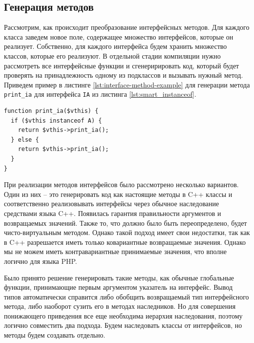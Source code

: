 \subsection{Генерация методов}
Рассмотрим, как происходит преобразование интерфейсных методов.
Для каждого класса заведем новое поле, содержащее множество интерфейсов, которые он реализует.
Собственно, для каждого интерфейса будем хранить множество классов, которые его реализуют.
В отдельной стадии компиляции нужно рассмотреть все интерфейсные функции и сгенеририровать код, который будет проверять на принадлежность одному из подклассов и вызывать нужный метод.
Приведем пример в листинге \ref{lst:interface-method-example} для генерации метода \verb|print_ia| для интерфейса \verb|IA| из листинга \ref{lst:smart_instanceof}.
\begin{lstlisting}[caption={Пример генерации интерфейсного метода},label={lst:interface-method-example}]
function print_ia($vthis) {
  if ($vthis instanceof A) {
    return $vthis->print_ia();
  } else {
    return $vthis->print_ia();
  }
}
\end{lstlisting}

При реализации методов интерфейсов было рассмотрено несколько вариантов.
Один из них -- это генерировать код как настоящие методы в C++ классы и соответственно реализовывать интерфейсы через обычное наследование средствами языка C++.
Появилась гарантия правильности аргументов и возвращаемых значений.
Также то, что должно было быть переопределено, будет чисто-виртуальным методом.
Однако такой подход имеет свои недостатки, так как в C++ разрешается иметь только ковариантные возвращаемые значения.
Однако мы не можем иметь контравариантные принимаемые значения, что вполне логично для языка PHP.

Было принято решение генерировать такие методы, как обычные глобальные функции, принимающие первым аргументом указатель на интерфейс.
Вывод типов автоматически справится либо обобщить возвращаемый тип интерфейсного метода, либо наоборот сузить его в методах наследников.
Но для совершения понижающего приведения все еще необходима иерархия наследования, поэтому логично совместить два подхода.
Будем наследовать классы от интерфейсов, но методы будем создавать отдельно.

